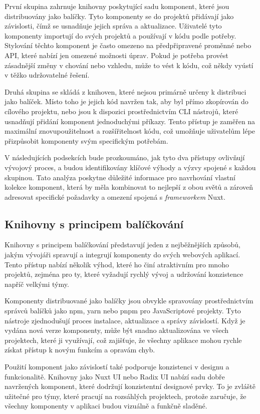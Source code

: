 První skupina zahrnuje knihovny poskytující sadu komponent, které jsou distribuovány jako balíčky. Tyto komponenty se do projektů přidávají jako závislosti, čímž se usnadňuje jejich správa a aktualizace. Uživatelé tyto komponenty importují do svých projektů a používají v kódu podle potřeby. Stylování těchto komponent je často omezeno na předpřipravené proměnné nebo API, které nabízí jen omezené možnosti úprav. Pokud je potřeba provést zásadnější změny v chování nebo vzhledu, může to vést k  kódu, což někdy vyústí v těžko udržovatelné řešení.

Druhá skupina se skládá z knihoven, které nejsou primárně určeny k distribuci jako balíček. Místo toho je jejich kód navržen tak, aby byl přímo zkopírován do cílového projektu, nebo jsou k dispozici prostřednictvím CLI nástrojů, které usnadňují přidání komponent jednoduchými příkazy. Tento přístup je zaměřen na maximální znovupoužitelnost a rozšířitelnost kódu, což umožňuje uživatelům lépe přizpůsobit komponenty svým specifickým potřebám.

V následujících podsekcích bude prozkoumáno, jak tyto dva přístupy ovlivňují vývojový proces, a budou identifikovány klíčové výhody a výzvy spojené s každou skupinou. Tato analýza poskytne důležité informace pro navrhování vlastní kolekce komponent, která by měla kombinovat to nejlepší z obou světů a zároveň adresovat specifické požadavky a omezení spojená s \emph{frameworkem} Nuxt.

\subsection{Knihovny s principem balíčkování}
Knihovny s principem balíčkování představují jeden z nejběžnějších způsobů, jakým vývojáři spravují a integrují komponenty do svých webových aplikací. Tento přístup nabízí několik výhod, které ho činí atraktivním pro mnoho projektů, zejména pro ty, které vyžadují rychlý vývoj a udržování konzistence napříč velkými týmy.

Komponenty distribuované jako balíčky jsou obvykle spravovány prostřednictvím správců balíčků jako npm, yarn nebo pnpm pro JavaScriptové projekty. Tyto nástroje zjednodušují proces instalace, aktualizace a správy závislostí. Když je vydána nová verze komponenty, může být snadno aktualizována ve všech projektech, které ji využívají, což zajišťuje, že všechny aplikace mohou rychle získat přístup k novým funkcím a opravám chyb.

Použití komponent jako závislostí také podporuje konzistenci v designu a funkcionalitě. Knihovny jako Nuxt UI nebo Radix UI nabízí sadu dobře navržených komponent, které dodržují konzistentní designové prvky. To je zvláště užitečné pro týmy, které pracují na rozsáhlých projektech, protože zaručuje, že všechny komponenty v aplikaci budou vizuálně a funkčně sladěné.

